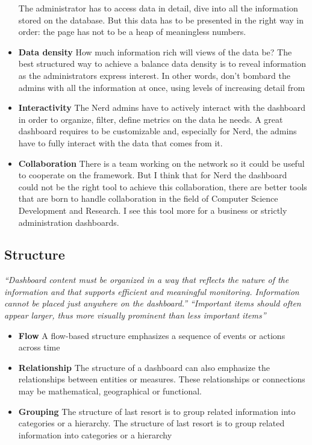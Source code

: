 \documentclass[a4paper,13pt]{report}
\begin{document}
\begin{itemize}
The administrator has to access data in detail, dive into all the information stored on the database. But this data has to be presented in the right way in order: the page has not to be a heap of meaningless numbers.
\item \textbf{Data density}\newline
 How much information rich will views of the data be? The best structured way to achieve a balance data density is to reveal information as the administrators express interest. In other words, don't bombard the admins with all the information at once, using levels of increasing detail from 
\item \textbf{Interactivity}\newline
The Nerd admins have to actively interact with the dashboard in order to organize, filter, define metrics on the data he needs. A great dashboard requires to be customizable and, especially for Nerd, the admins have to fully interact with the data that comes from it.
\item \textbf{Collaboration}\newline
There is a team working on the network so it could be useful to cooperate on the framework. But I think that for Nerd the dashboard could not be the right tool to achieve this collaboration, there are better tools that are born to handle collaboration in the field of Computer Science Development and Research. 
I see this tool more for a business or strictly administration dashboards.
\end{itemize}
\subsection{Structure}
\emph{``Dashboard content must be organized in a way that reflects the nature of the information and that supports efficient and meaningful monitoring. Information cannot be placed just anywhere on the dashboard.''}\newline
\emph{``Important items should often appear larger, thus more visually prominent than less important items''}

\begin{itemize}
    \item \textbf{Flow}\newline
    A flow-based structure emphasizes a sequence of events or actions across time
    \item \textbf{Relationship}\newline
    The structure of a dashboard can also emphasize the relationships between entities or measures. These relationships or connections may be mathematical, geographical or functional.
    \item \textbf{Grouping}\newline
    The structure of last resort is to group related information into categories or a hierarchy. The structure of last resort is to group related information into categories or a hierarchy
\end{itemize}
\end{document}
